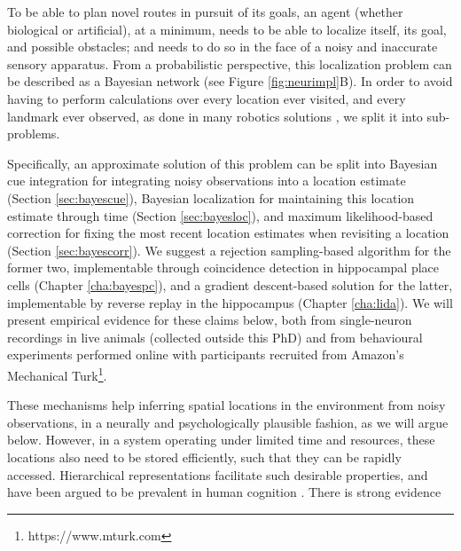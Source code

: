To be able to plan novel routes in pursuit of its goals, an agent (whether biological or artificial), at a minimum, needs to be able to localize itself, its goal, and possible obstacles; and needs to do so in the face of a noisy and inaccurate sensory apparatus. From a probabilistic perspective, this localization problem can be described as a Bayesian network (see Figure \ref{fig:neurimpl}B). In order to avoid having to perform calculations over every location ever visited, and every landmark ever observed, as done in many robotics solutions \citep{durrant2006simultaneous,bailey2006simultaneous}, we split it into sub-problems. 

Specifically, an approximate solution of this problem can be split into Bayesian cue integration for integrating noisy observations into a location estimate (Section \ref{sec:bayescue}), Bayesian localization for maintaining this location estimate through time (Section \ref{sec:bayesloc}), and maximum likelihood-based correction for fixing the most recent location estimates when revisiting a location (Section \ref{sec:bayescorr}). We suggest a rejection sampling-based algorithm for the former two, implementable through coincidence detection in hippocampal place cells (Chapter \ref{cha:bayespc}), and a gradient descent-based solution for the latter, implementable by reverse replay in the hippocampus (Chapter \ref{cha:lida}). We will present empirical evidence for these claims below, both from single-neuron recordings in live animals (collected outside this PhD) and from behavioural experiments performed online with participants recruited from Amazon's Mechanical Turk\footnote{https://www.mturk.com}.

These mechanisms help inferring spatial locations in the environment from noisy observations, in a neurally and psychologically plausible fashion, as we will argue below. However, in a system operating under limited time and resources, these locations also need to be stored efficiently, such that they can be rapidly accessed. Hierarchical representations facilitate such desirable properties, and have been argued to be prevalent in human cognition \citep{cohen2000hierarchical, gobet2001chunking}. There is strong evidence

\nocite{deshmukh2013}

